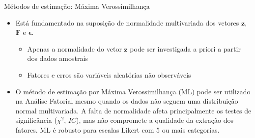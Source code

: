 \documentclass[
  ignorenonframetext,
  aspectratio=169,
]{beamer}
\providecommand{\tightlist}{%
  \setlength{\itemsep}{0pt}\setlength{\parskip}{0pt}}
\begin{document}
\begin{frame}{Métodos de estimação: Máxima Verossimilhança}
\label{muxe9todos-de-estimauxe7uxe3o-muxe1xima-verossimilhanuxe7a-3}
\begin{tcolorbox}[enhanced jigsaw, opacityback=0, left=2mm, colbacktitle=quarto-callout-warning-color!10!white, rightrule=.15mm, leftrule=.75mm, coltitle=black, toptitle=1mm, titlerule=0mm, toprule=.15mm, breakable, title=\textcolor{quarto-callout-warning-color}{\faExclamationTriangle}\hspace{0.5em}{Cuidado!}, colback=white, arc=.35mm, opacitybacktitle=0.6, bottomtitle=1mm, colframe=quarto-callout-warning-color-frame, bottomrule=.15mm]

\begin{itemize}
\tightlist
\item
  Está fundamentado na suposição de normalidade multivariada dos vetores
  \(\boldsymbol{z}\), \(\boldsymbol{F}\) e \(\boldsymbol{\epsilon}\).

  \begin{itemize}
  \tightlist
  \item
    Apenas a normalidade do vetor \(\boldsymbol{z}\) pode ser
    investigada a priori a partir dos dados amostrais
  \item
    Fatores e erros são variáveis aleatórias não observáveis
  \end{itemize}
\end{itemize}

\end{tcolorbox}

\pause

\begin{tcolorbox}[enhanced jigsaw, opacityback=0, left=2mm, colbacktitle=quarto-callout-tip-color!10!white, rightrule=.15mm, leftrule=.75mm, coltitle=black, toptitle=1mm, titlerule=0mm, toprule=.15mm, breakable, title=\textcolor{quarto-callout-tip-color}{\faLightbulb}\hspace{0.5em}{Observação Importante}, colback=white, arc=.35mm, opacitybacktitle=0.6, bottomtitle=1mm, colframe=quarto-callout-tip-color-frame, bottomrule=.15mm]

\begin{itemize}
\tightlist
\item
  O método de estimação por Máxima Verossimilhança (ML) pode ser
  utilizado na Análise Fatorial mesmo quando os dados não seguem uma
  distribuição normal multivariada. A falta de normalidade afeta
  principalmente os testes de significância (\(\chi^2\), \(IC\)), mas
  não compromete a qualidade da extração dos fatores. ML é robusto para
  escalas Likert com 5 ou mais categorias.
\end{itemize}

\end{tcolorbox}
\end{frame}
\end{document}
